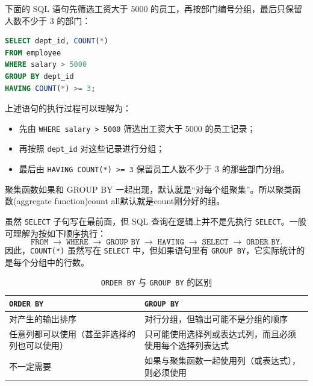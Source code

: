\begin{example}
下面的 SQL 语句先筛选工资大于 5000 的员工，再按部门编号分组，最后只保留人数不少于 3 的部门：
\begin{lstlisting}[language=SQL]
SELECT dept_id, COUNT(*)
FROM employee
WHERE salary > 5000
GROUP BY dept_id
HAVING COUNT(*) >= 3;
\end{lstlisting}
\end{example}

\begin{note}
上述语句的执行过程可以理解为：
\begin{itemize}
    \item 先由 \texttt{WHERE salary > 5000} 筛选出工资大于 5000 的员工记录；
    \item 再按照 \texttt{dept\_id} 对这些记录进行分组；
    \item 最后由 \texttt{HAVING COUNT(*) >= 3} 保留员工人数不少于 3 的那些部门分组。
\end{itemize}
\end{note}
\begin{dxtips}
    聚集函数如果和 GROUP BY 一起出现，默认就是“对每个组聚集”。所以聚类函数(aggregate function)count all默认就是count刚分好的组。
\end{dxtips}
\begin{note}
虽然 \texttt{SELECT} 子句写在最前面，但 SQL 查询在逻辑上并不是先执行 \texttt{SELECT}。一般可理解为按如下顺序执行：
\[
\texttt{FROM} \;\to\; \texttt{WHERE} \;\to\; \texttt{GROUP BY} \;\to\; \texttt{HAVING} \;\to\; \texttt{SELECT} \;\to\; \texttt{ORDER BY}.
\]
因此，\texttt{COUNT(*)} 虽然写在 \texttt{SELECT} 中，但如果语句里有 \texttt{GROUP BY}，它实际统计的是每个分组中的行数。
\end{note}
\begin{table}[htbp]
    \centering
    \caption{\texttt{ORDER BY} 与 \texttt{GROUP BY} 的区别}
    \begin{tabular}{p{5.2cm}p{5.2cm}}
        \toprule
        \centering \texttt{ORDER BY} & \centering \texttt{GROUP BY} \tabularnewline
        \midrule
        对产生的输出排序 & 对行分组，但输出可能不是分组的顺序 \\[6pt]
        任意列都可以使用（甚至非选择的列也可以使用） & 只可能使用选择列或表达式列，而且必须使用每个选择列表达式 \\[6pt]
        不一定需要 & 如果与聚集函数一起使用列（或表达式），则必须使用 \\
        \bottomrule
    \end{tabular}
\end{table}

